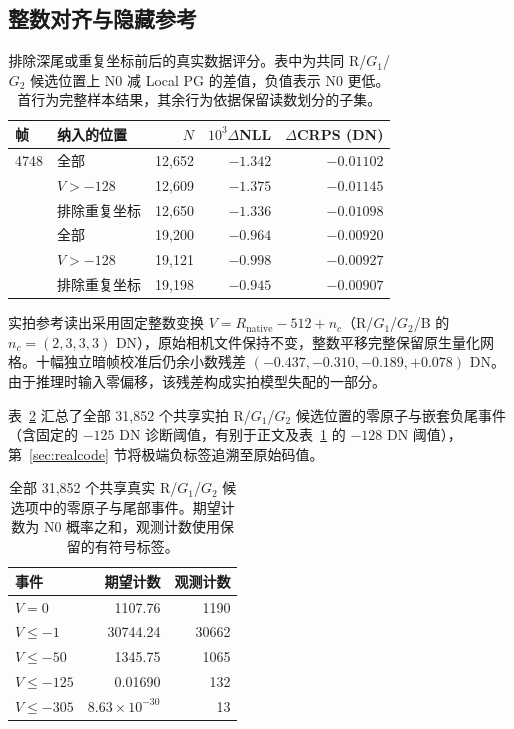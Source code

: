 \documentclass[10pt,twocolumn,journal]{IEEEtran}
\begin{document}
\subsection{整数对齐与隐藏参考}
\begin{table}[t]
\centering\footnotesize
\setlength{\tabcolsep}{2.2pt}
\caption{排除深尾或重复坐标前后的真实数据评分。表中为共同 R/$G_1$/$G_2$ 候选位置上 N0 减 Local PG 的差值，负值表示 N0 更低。首行为完整样本结果，其余行为依据保留读数划分的子集。}
\label{tab:real_robust}
\begin{tabular}{@{}llrrr@{}}
\toprule
帧 & 纳入的位置 & $N$ & $10^3\Delta$NLL & $\Delta$CRPS (DN)\\
\midrule
4748 & 全部 & 12,652 & $-1.342$ & $-0.01102$\\
 & $V>-128$ & 12,609 & $-1.375$ & $-0.01145$\\
 & 排除重复坐标 & 12,650 & $-1.336$ & $-0.01098$\\
\addlinespace[2pt]
4749 & 全部 & 19,200 & $-0.964$ & $-0.00920$\\
 & $V>-128$ & 19,121 & $-0.998$ & $-0.00927$\\
 & 排除重复坐标 & 19,198 & $-0.945$ & $-0.00907$\\
\bottomrule
\end{tabular}
\end{table}

实拍参考读出采用固定整数变换 $V=R_{\mathrm{native}}-512+n_c$（R/$G_1$/$G_2$/B 的 $n_c=(2,3,3,3)$ DN），原始相机文件保持不变，整数平移完整保留原生量化网格。十幅独立暗帧校准后仍余小数残差 $(-0.437,-0.310,-0.189,+0.078)$ DN。由于推理时输入零偏移，该残差构成实拍模型失配的一部分。

表~\ref{tab:tail_original} 汇总了全部 31,852 个共享实拍 R/$G_1$/$G_2$ 候选位置的零原子与嵌套负尾事件（含固定的 $-125$ DN 诊断阈值，有别于正文及表~\ref{tab:real_robust} 的 $-128$ DN 阈值），第~\ref{sec:realcode} 节将极端负标签追溯至原始码值。

\begin{table}[t]
\centering
\caption{全部 31,852 个共享真实 R/$G_1$/$G_2$ 候选项中的零原子与尾部事件。期望计数为 N0 概率之和，观测计数使用保留的有符号标签。}
\label{tab:tail_original}
\begin{tabular}{@{}lrr@{}}
\toprule
事件 & 期望计数 & 观测计数\\
\midrule
$V=0$ & 1107.76 & 1190\\
$V\leq-1$ & 30744.24 & 30662\\
$V\leq-50$ & 1345.75 & 1065\\
$V\leq-125$ & 0.01690 & 132\\
$V\leq-305$ & $8.63\times10^{-30}$ & 13\\
\bottomrule
\end{tabular}
\end{table}
\end{document}
